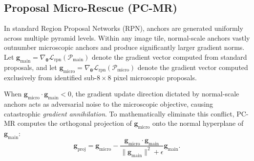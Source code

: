 \subsection{Proposal Micro-Rescue (PC-MR)}
\label{subsec:pc_mr}
In standard Region Proposal Networks (RPN), anchors are generated uniformly across multiple pyramid levels. Within any image tile, normal-scale anchors vastly outnumber microscopic anchors and produce significantly larger gradient norms. Let $\mathbf{g}_{\mathrm{main}} = \nabla_{\boldsymbol{\theta}} \mathcal{L}_{\mathrm{rpn}}(\mathcal{P}_{\mathrm{main}})$ denote the gradient vector computed from standard proposals, and let $\mathbf{g}_{\mathrm{micro}} = \nabla_{\boldsymbol{\theta}} \mathcal{L}_{\mathrm{rpn}}(\mathcal{P}_{\mathrm{micro}})$ denote the gradient vector computed exclusively from identified sub-$8\times 8$ pixel microscopic proposals.

When $\mathbf{g}_{\mathrm{micro}} \cdot \mathbf{g}_{\mathrm{main}} < 0$, the gradient update direction dictated by normal-scale anchors acts as adversarial noise to the microscopic objective, causing catastrophic \emph{gradient annihilation}. To mathematically eliminate this conflict, PC-MR computes the orthogonal projection of $\mathbf{g}_{\mathrm{micro}}$ onto the normal hyperplane of $\mathbf{g}_{\mathrm{main}}$:
\begin{equation}
\mathbf{g}_{\mathrm{proj}} = \mathbf{g}_{\mathrm{micro}} - \frac{\mathbf{g}_{\mathrm{micro}} \cdot \mathbf{g}_{\mathrm{main}}}{\|\mathbf{g}_{\mathrm{main}}\|^2 + \epsilon} \mathbf{g}_{\mathrm{main}}.
\label{eq:g_proj}
\end{equation}

